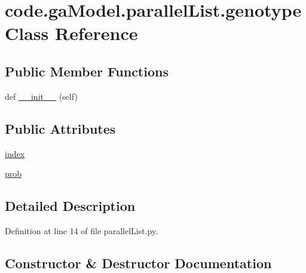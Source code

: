 \hypertarget{classcode_1_1ga_model_1_1parallel_list_1_1genotype}{}\section{code.\+ga\+Model.\+parallel\+List.\+genotype Class Reference}
\label{classcode_1_1ga_model_1_1parallel_list_1_1genotype}
\subsection*{Public Member Functions}
\begin{DoxyCompactItemize}
\item 
def \hyperlink{classcode_1_1ga_model_1_1parallel_list_1_1genotype_a34aa00674f0141133dc7d50039b4de5b}{\+\_\+\+\_\+init\+\_\+\+\_\+} (self)
\end{DoxyCompactItemize}
\subsection*{Public Attributes}
\begin{DoxyCompactItemize}
\item 
\hyperlink{classcode_1_1ga_model_1_1parallel_list_1_1genotype_a65a45a46f2a173f35759aa6693eee9f4}{index}
\item 
\hyperlink{classcode_1_1ga_model_1_1parallel_list_1_1genotype_ada7cc089db398d8386f5f29d8e895aef}{prob}
\end{DoxyCompactItemize}


\subsection{Detailed Description}


Definition at line 14 of file parallel\+List.\+py.



\subsection{Constructor \& Destructor Documentation}
\mbox{\label{classcode_1_1ga_model_1_1parallel_list_1_1genotype_a34aa00674f0141133dc7d50039b4de5b}} 
